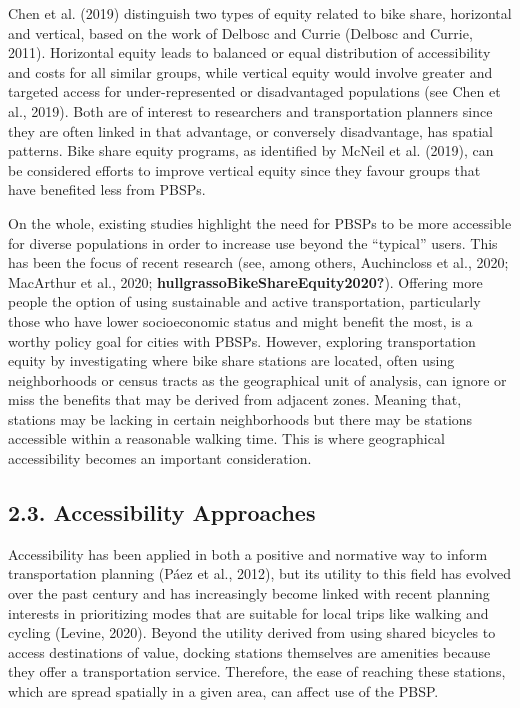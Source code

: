 \documentclass[]{elsarticle} %
\begin{document}
Chen et al. (2019) distinguish two types of equity related to bike
share, horizontal and vertical, based on the work of Delbosc and Currie
(Delbosc and Currie, 2011). Horizontal equity leads to balanced or equal
distribution of accessibility and costs for all similar groups, while
vertical equity would involve greater and targeted access for
under-represented or disadvantaged populations (see Chen et al., 2019).
Both are of interest to researchers and transportation planners since
they are often linked in that advantage, or conversely disadvantage, has
spatial patterns. Bike share equity programs, as identified by McNeil et
al. (2019), can be considered efforts to improve vertical equity since
they favour groups that have benefited less from PBSPs.

On the whole, existing studies highlight the need for PBSPs to be more
accessible for diverse populations in order to increase use beyond the
``typical'' users. This has been the focus of recent research (see,
among others, Auchincloss et al., 2020; MacArthur et al., 2020;
\textbf{hullgrassoBikeShareEquity2020?}). Offering more people the
option of using sustainable and active transportation, particularly
those who have lower socioeconomic status and might benefit the most, is
a worthy policy goal for cities with PBSPs. However, exploring
transportation equity by investigating where bike share stations are
located, often using neighborhoods or census tracts as the geographical
unit of analysis, can ignore or miss the benefits that may be derived
from adjacent zones. Meaning that, stations may be lacking in certain
neighborhoods but there may be stations accessible within a reasonable
walking time. This is where geographical accessibility becomes an
important consideration.

\hypertarget{accessibility-approaches}{%
\subsection{2.3. Accessibility
Approaches}\label{accessibility-approaches}}

Accessibility has been applied in both a positive and normative way to
inform transportation planning (Páez et al., 2012), but its utility to
this field has evolved over the past century and has increasingly become
linked with recent planning interests in prioritizing modes that are
suitable for local trips like walking and cycling (Levine, 2020). Beyond
the utility derived from using shared bicycles to access destinations of
value, docking stations themselves are amenities because they offer a
transportation service. Therefore, the ease of reaching these stations,
which are spread spatially in a given area, can affect use of the PBSP.
\end{document}
